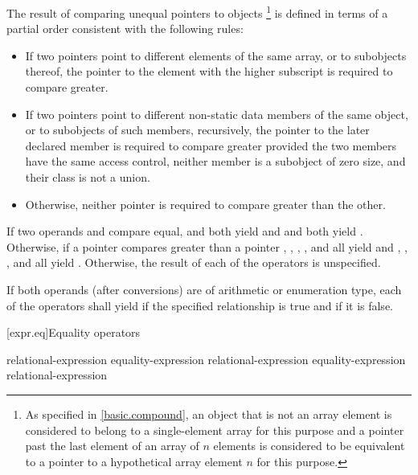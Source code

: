 \pnum
The result of comparing unequal pointers to objects%
\footnote{As specified in \ref{basic.compound},
an object that is not an array element
is considered to belong to a
single-element array for this purpose and
a pointer past the last element of an array of $n$ elements
is considered to be equivalent to a pointer to a hypothetical array element
$n$ for this purpose.}
is defined in terms of a partial order consistent with the following rules:

\begin{itemize}
\item If two pointers point to different elements of the same array, or to
subobjects thereof, the pointer to the element with the higher subscript
is required to compare greater.

\item If two pointers point to different non-static data members of the same
object, or to subobjects of such members, recursively,
the pointer to the later declared member is required to compare greater provided
the two members have the same access control,
neither member is a subobject of zero size,
and their class is not a union.

\item Otherwise, neither pointer is required to compare greater than the other.

\end{itemize}

\pnum
If two operands  and  compare equal,
 and  both yield  and  and
 both yield . Otherwise, if a pointer 
compares greater than a pointer , , ,
, and  all yield  and ,
, , and  all yield .
Otherwise, the result of each of the operators is unspecified.

\pnum
If both operands (after conversions) are of arithmetic or enumeration type, each
of the operators shall yield  if the specified relationship is true
and  if it is false.

[expr.eq]{Equality operators}%
%
%

\begin{bnf}
\br
    relational-expression\br
    equality-expression \terminal{==} relational-expression\br
    equality-expression \terminal{!=} relational-expression
\end{bnf}

